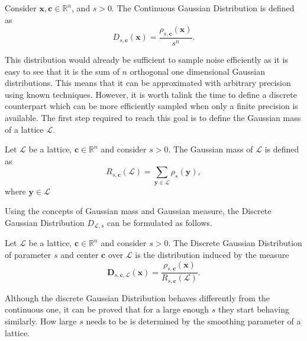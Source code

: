 \begin{definition}
Consider $\mathbf{x},\mathbf{c}\in\mathbb{R}^n$, and $s>0$. The Continuous Gaussian Distribution is defined as
\begin{equation*}
D_{s,\mathbf{c}}(\mathbf{x})=\frac{\rho_{s,\mathbf{c}}(\mathbf{x})}{s^n}.
\end{equation*}
\end{definition}

This distribution would already be sufficient to sample noise efficiently as it is easy to see that it is the sum of $n$ orthogonal one dimensional Gaussian distributions. This means that it can be approximated with arbitrary precision using known techniques. However, it is worth talink the time to define a discrete counterpart which can be more efficiently sampled when only a finite precision is available. The first step required to reach this goal is to define the Gaussian mass of a lattice $\mathscr{L}$.

\begin{definition}
Let $\mathscr{L}$ be a lattice, $\mathbf{c}\in\mathbb{R}^n$ and consider $s>0$. The Gaussian mass of $\mathscr{L}$ is defined as
\begin{equation*}
R_{s,\mathbf{c}}(\mathscr{L})=\sum_{\mathbf{y}\in\mathscr{L}}\rho_s(\mathbf{y}),
\end{equation*}
where $\mathbf{y}\in\mathscr{L}$
\end{definition}

Using the concepts of Gaussian mass and Gaussian measure, the Discrete Gaussian Distribution $D_{\mathscr{L},s}$ can be formulated as follows.

\begin{definition}
Let $\mathscr{L}$ be a lattice, $\mathbf{c}\in\mathbb{R}^n$ and consider $s>0$. The Discrete Gaussian Distribution of parameter $s$ and center $\mathbf{c}$ over $\mathscr{L}$ is the distribution induced by the measure
\begin{equation*}
\mathbf{D}_{s,\mathbf{c},\mathscr{L}}(\mathbf{x})= \frac{\rho_{s,\mathbf{c}}(\mathbf{x})}{R_{s,\mathbf{c}}(\mathscr{L})}.
\end{equation*}
\end{definition}

\begin{remark}
Although the discrete Gaussian Distribution behaves differently from the continuous one, it can be proved that for a large enough $s$ they start behaving similarly. How large $s$ needs to be is determined by the smoothing parameter of a lattice.
\end{remark}

